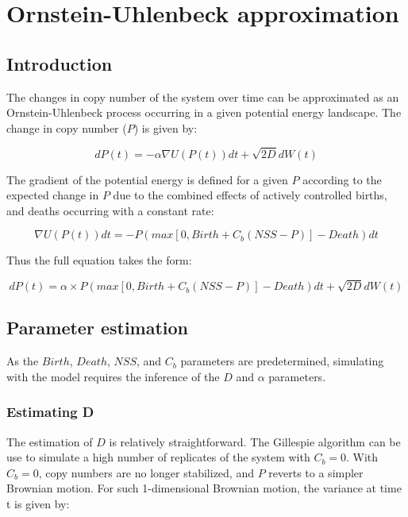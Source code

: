 \documentclass[]{article}
\title{}
\author{}
\begin{document}
\maketitle

\begin{abstract}

\end{abstract}

\section{Ornstein-Uhlenbeck approximation}

\subsection{Introduction}

The changes in copy number of the system over time can be approximated as an Ornstein-Uhlenbeck process occurring in a given potential energy landscape. The change in copy number ($P$) is given by:

\begin{equation} \label{eq:o_u} 
	dP(t) = -\alpha \nabla U(P(t))dt + \sqrt{2 D} dW(t)
\end{equation} 

The gradient of the potential energy is defined for a given $P$ according to the expected change in $P$ due to the combined effects of actively controlled births, and deaths occurring with a constant rate:

\begin{equation} \label{eq:gradient} 
	\nabla U(P(t))dt = - P(max[0, Birth + C_b (NSS-P)] - Death)dt
\end{equation} 

Thus the full equation takes the form:

\begin{equation} \label{eq:o_u_full} 
	dP(t) = \alpha \times P(max[0, Birth + C_b (NSS-P)] - Death)dt + \sqrt{2 D} dW(t)
\end{equation} 

\subsection{Parameter estimation}

As the $Birth$, $Death$, $NSS$, and $C_b$ parameters are predetermined, simulating with the model requires the inference of the $D$ and $\alpha$ parameters. 

\subsubsection{Estimating D}
The estimation of $D$ is relatively straightforward. The Gillespie algorithm can be use to simulate a high number of replicates of the system with $C_b = 0$. With $C_b = 0$, copy numbers are no longer stabilized, and $P$ reverts to a simpler Brownian motion. For such 1-dimensional Brownian motion, the variance at time t is given by: 
\end{document}
